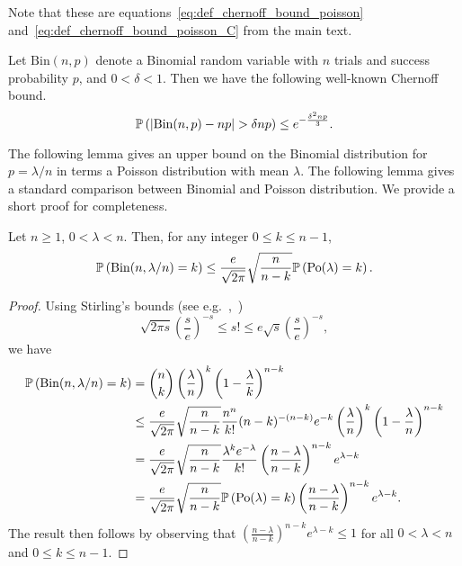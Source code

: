 \begin{appendices}
Note that these are equations~\eqref{eq:def_chernoff_bound_poisson} and~\eqref{eq:def_chernoff_bound_poisson_C} from the main text.

Let $\mathrm{Bin}(n,p)$ denote a Binomial random variable with $n$ trials and success probability $p$, and $0 < \delta < 1$. Then we have the following well-known Chernoff bound.
\begin{equation}\label{eq:def_chernoff_bound_binomial}
	\mathbb{P}\left(|\mathrm{Bin}(n,p) - np| > \delta np\right) \le e^{-\frac{\delta^2 np}{3}}.
\end{equation}

The following lemma gives an upper bound on the Binomial distribution for $p = \lambda/n$ in terms a Poisson distribution with mean $\lambda$.
The following lemma  gives a standard comparison between Binomial and Poisson distribution. We provide a short proof  for completeness.

\begin{lemma}\label{lem:binomial_poisson_bound}
Let $n \ge 1$, $0 < \lambda < n$. Then, for any integer $0 \le k \le n - 1$,
\[
	\mathbb{P}\left(\mathrm{Bin}(n,\lambda/n) = k\right) \le \frac{e}{\sqrt{2\pi}} \sqrt{\frac{n}{n-k}} \mathbb{P}\left({\mathrm{Po}}(\lambda) = k\right).
\]
\end{lemma}

\begin{proof}
Using Stirling's bounds (see e.g.~\cite{Dutkay2013},~\cite{Nanjundiah1959})
	\[
	\sqrt{2\pi s} \left(\frac{s}{e}\right)^{-s} \le s! \le e \sqrt{s} \left(\frac{s}{e}\right)^{-s},
	\]
we have
\begin{align*}
	\mathbb{P}\left(\mathrm{Bin}(n,\lambda/n) = k\right)
	&= \binom{n}{k} \left(\frac{\lambda}{n}\right)^k \left(1 - \frac{\lambda}{k}\right)^{n - k}\\
	&\le \frac{e}{\sqrt{2\pi}} \sqrt{\frac{n}{n - k}} \frac{n^n}{k!} (n-k)^{-(n-k)} e^{-k}
		\left(\frac{\lambda}{n}\right)^k \left(1 - \frac{\lambda}{n}\right)^{n - k}\\
	&= \frac{e}{\sqrt{2\pi}} \sqrt{\frac{n}{n - k}} \frac{\lambda^k e^{-\lambda}}{k!}
		\left(\frac{n-\lambda}{n - k}\right)^{n - k} e^{\lambda - k}\\
	&= \frac{e}{\sqrt{2\pi}} \sqrt{\frac{n}{n-k}} \mathbb{P}\left({\mathrm{Po}}(\lambda) = k\right)
		\left(\frac{n-\lambda}{n - k}\right)^{n - k} e^{\lambda - k}.
\end{align*}
The result then follows by observing that $\left(\frac{n-\lambda}{n - k}\right)^{n - k} e^{\lambda - k} \le 1$ for all $0 < \lambda < n$ and $0 \le k \le n - 1$.
\end{proof}


\end{appendices}

